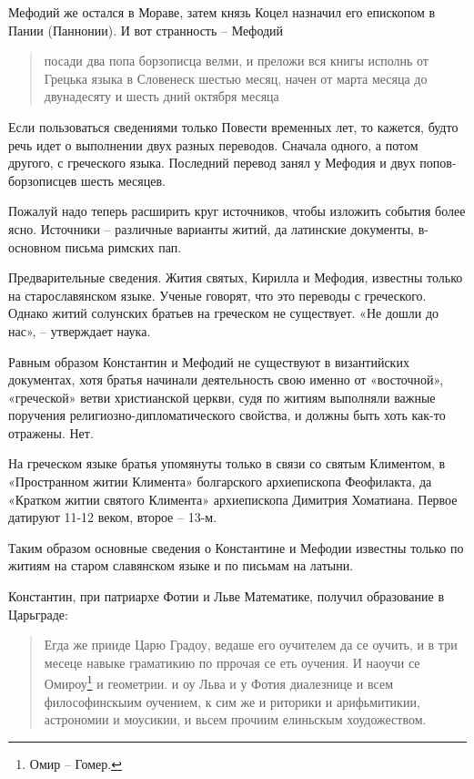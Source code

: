 Мефодий же остался в Мораве, затем князь Коцел назначил его епископом в Пании (Паннонии). И вот странность – Мефодий

\begin{quotation}
посади два попа борзописца велми, и преложи вся книгы исполнь от Грецька языка в Словенеск шестью месяц, начен от марта месяца до двунадесяту и шесть дний октября месяца
\end{quotation}

Если пользоваться сведениями только Повести временных лет, то кажется, будто речь идет о выполнении двух разных переводов. Сначала одного, а потом другого, с греческого языка. Последний перевод занял у Мефодия и двух попов-борзописцев шесть месяцев.

Пожалуй надо теперь расширить круг источников, чтобы изложить события более ясно. Источники – различные варианты житий, да латинские документы, в-основном письма римских пап.

Предварительные сведения. Жития святых, Кирилла и Мефодия, известны только на старославянском  языке. Ученые говорят, что это переводы с греческого. Однако житий солунских братьев на греческом не существует. «Не дошли до нас», – утверждает наука.

Равным образом Константин и Мефодий не существуют в византийских документах, хотя братья начинали деятельность свою именно от «восточной», «греческой» ветви христианской церкви, судя по житиям выполняли важные поручения религиозно-дипломатического свойства, и должны быть хоть как-то отражены. Нет.

На греческом языке братья упомянуты только в связи со святым Климентом, в «Пространном житии Климента» болгарского архиепископа Феофилакта, да «Кратком житии святого Климента» архиепископа Димитрия Хоматиана. Первое датируют 11-12 веком, второе – 13-м.

Таким образом основные сведения о Константине и Мефодии известны только по житиям на старом славянском языке и по письмам на латыни.

Константин, при патриархе Фотии и Льве Математике, получил образование в Царьграде:

\begin{quotation} 
Егда же прииде Царю Градоу, ведаше его оучителем да се оучить, и в три месеце навыке граматикию по пррочая се еть оучения. И наоучи се Омироу\footnote{Омир – Гомер.} и геометрии. и оу Льва и у Фотия диалезнице и всем философинскыим оучением, к сим же и риторики и арифьмитикии, астрономии и моусикии, и вьсем прочиим елиньскым хоудожеством.
\end{quotation} 

